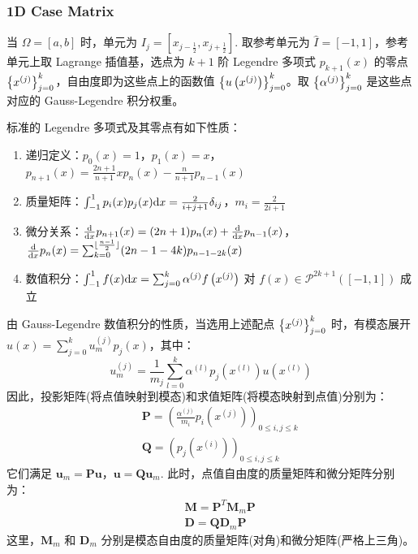 \subsubsection{1D Case Matrix}

当 \(\Omega = [a,b]\) 时，单元为 \(I_{j} = [x_{j-\frac{1}{2}}, x_{j+\frac{1}{2}}]\). 取参考单元为 \(\widehat{I} = [-1,1]\)，参考单元上取 Lagrange 插值基，选点为 \(k+1\) 阶 Legendre 多项式 \(p_{k+1}(x)\) 的零点 \(\left\{x^{(j)}\right\}_{j=0}^{k}\)，自由度即为这些点上的函数值 \(\left\{u\left(x^{(j)}\right)\right\}_{j=0}^{k}\)。取 \(\left\{\alpha^{(j)}\right\}_{j=0}^{k}\) 是这些点对应的 Gauss-Legendre 积分权重。

标准的 Legendre 多项式及其零点有如下性质：
\begin{enumerate}
	\item 递归定义：\(p_{0}(x) = 1\)，\(p_1(x) = x\)，\(p_{n+1}(x) = \frac{2n+1}{n+1} x p_n(x) - \frac{n}{n+1} p_{n-1}(x)\)
	\item 质量矩阵：\(\int_{-1}^{1} p_{i}(x) p_{j}(x) \mathrm{d} x = \frac{2}{i + j + 1} \delta_{i j}\)，\(m_{i} = \frac{2}{2i+1}\)
	\item 微分关系：\(\frac{\mathrm{d}}{\mathrm{d} x}p_{n+1}(x) = (2n+1)p_n(x) + \frac{\mathrm{d}}{\mathrm{d} x}p_{n-1}(x)\)，\(\frac{\mathrm{d}}{\mathrm{d} x}p_{n}(x) = \sum_{k=0}^{\lfloor\frac{n-1}{2}\rfloor} (2n-1-4k) p_{n-1-2k}(x)\)
	\item 数值积分：\(\int_{-1}^{1} f(x) \mathrm{d} x = \sum_{j=0}^{k} \alpha^{(j)} f\left(x^{(j)}\right)\) 对 \(f(x) \in \mathscr{P}^{2k+1}([-1,1])\) 成立
\end{enumerate}

由 Gauss-Legendre 数值积分的性质，当选用上述配点 \(\left\{x^{(j)}\right\}_{j=0}^{k}\) 时，有模态展开 \(u(x) = \sum_{j=0}^{k} u_{m}^{(j)} p_{j}(x)\)，其中：
\begin{equation}
	u_{m}^{(j)} = \frac{1}{m_{j}}\sum_{l=0}^{k} \alpha^{(l)} p_{j}\left(x^{(l)}\right) u\left(x^{(l)}\right)
\end{equation}
因此，投影矩阵(将点值映射到模态)和求值矩阵(将模态映射到点值)分别为：
\begin{eqnarray}
	&& \bm{P} = \left(\frac{\alpha^{(j)}}{m_{i}} p_{i}\left(x^{(j)}\right)\right)_{0 \leqslant i, j \leqslant k} \\
	&& \bm{Q} = \left(p_{j}\left(x^{(i)}\right)\right)_{0 \leqslant i, j \leqslant k}
\end{eqnarray}
它们满足 \(\bm{u}_{m} = \bm{P}\bm{u}\)，\(\bm{u} = \bm{Q}\bm{u}_{m}\). 此时，点值自由度的质量矩阵和微分矩阵分别为：
\begin{eqnarray}
	&& \bm{M} = \bm{P}^{T} \bm{M}_{m} \bm{P} \\
	&& \bm{D} = \bm{Q} \bm{D}_{m} \bm{P}
\end{eqnarray}
这里，\(\bm{M}_{m}\) 和 \(\bm{D}_{m}\) 分别是模态自由度的质量矩阵(对角)和微分矩阵(严格上三角)。

